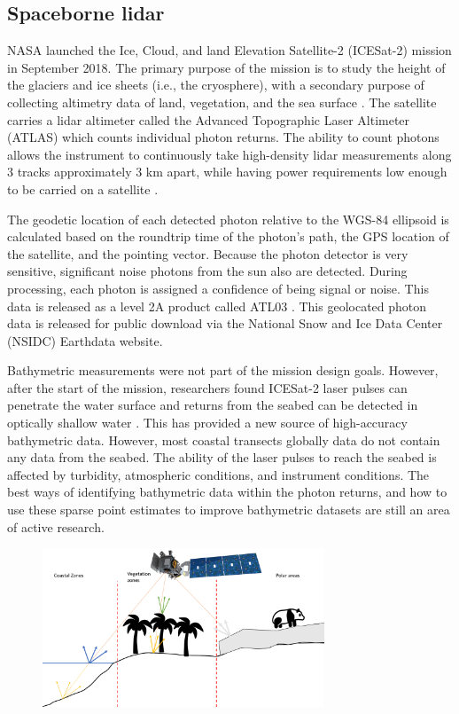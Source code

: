 \subsection{Spaceborne lidar}

NASA launched the Ice, Cloud, and land Elevation Satellite-2 (ICESat-2) mission in September 2018. The primary purpose of the mission is to study the height of the glaciers and ice sheets (i.e., the cryosphere), with a secondary purpose of collecting altimetry data of land, vegetation, and the sea surface \parencite{Markus2017}. The satellite carries a lidar altimeter called the Advanced Topographic Laser Altimeter (ATLAS) which counts individual photon returns. The ability to count photons allows the instrument to continuously take high-density lidar measurements along 3 tracks approximately 3 km apart, while having power requirements low enough to be carried on a satellite \parencite{Popescu2018}. 

The geodetic location of each detected photon relative to the WGS-84 ellipsoid is calculated based on the roundtrip time of the photon's path, the GPS location of the satellite, and the pointing vector. Because the photon detector is very sensitive, significant noise photons from the sun also are detected. During processing, each photon is assigned a confidence of being signal or noise. This data is released as a level 2A product called ATL03 \parencite{Neumann2019d}. This geolocated photon data is released for public download via the National Snow and Ice Data Center (NSIDC) Earthdata website.

Bathymetric measurements were not part of the mission design goals. However, after the start of the mission, researchers found ICESat-2 laser pulses can penetrate the water surface and returns from the seabed can be detected in optically shallow water \parencite{Parrish2019}. This has provided a new source of high-accuracy bathymetric data. However, most coastal transects globally data do not contain any data from the seabed. The ability of the laser pulses to reach the seabed is affected by turbidity, atmospheric conditions, and instrument conditions. The best ways of identifying bathymetric data within the photon returns, and how to use these sparse point estimates to improve bathymetric datasets are still an area of active research.


\begin{figure}[h!]
      \centering
      \includegraphics[width=0.75\textwidth]{figures/summary.pdf}
      \label{fig:icesat-summary-image}
  \end{figure}
  

